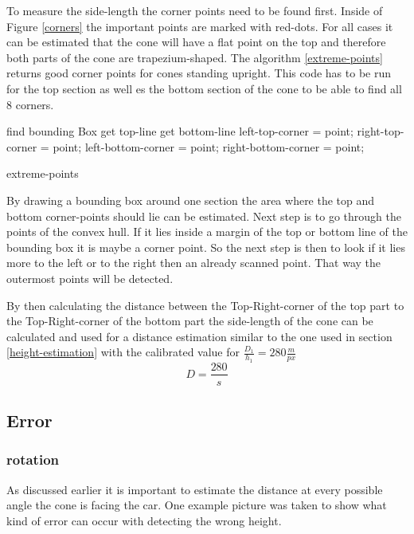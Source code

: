 \documentclass[10pt,a4paper]{article}
\begin{document}
	To measure the side-length the corner points need to be found first. Inside of Figure \ref{corners} the important points are marked with red-dots.
	For all cases it can be estimated that the cone will have a flat point on the top and therefore both parts of the cone are trapezium-shaped.
	The algorithm \ref{extreme-points} returns good corner points for cones standing upright. This code has to be run for the top section as well es the bottom section of the cone to be able to find all 8 corners.

	\begin{algorithm}
		find bounding Box\;
		get top-line\; 
		get bottom-line\;
			{
				{
					{left-top-corner = point;}
					{right-top-corner = point;}
				}
				{
					{left-bottom-corner = point;}
					{right-bottom-corner = point;}
			}
		}
	\label{extreme-points}
	\caption{extreme-points} 
	\end{algorithm}

	 
	By drawing a bounding box around one section the area where the top and bottom corner-points should lie can be estimated. Next step is to go through the points of the convex hull. If it lies inside a margin of the top or bottom line of the bounding box it is maybe a corner point. So the next step is then to look if it lies more to the left or to the right then an already scanned point. That way the outermost points will be detected.
	 
	By then calculating the distance between the Top-Right-corner of the top part to the Top-Right-corner of the bottom part the side-length of the cone can be calculated and used for a distance estimation similar to the one used in section \ref{height-estimation} with the calibrated value for $\frac{D_1}{h_1}=280\frac{m}{px}$
	$$D=\frac{280}{s}$$
	
	
	\subsection{Error}
	\subsubsection{rotation}
	As discussed earlier it is important to estimate the distance at every possible angle the cone is facing the car. One example picture was taken to show what kind of error can occur with detecting the wrong height.
	
\end{document}
